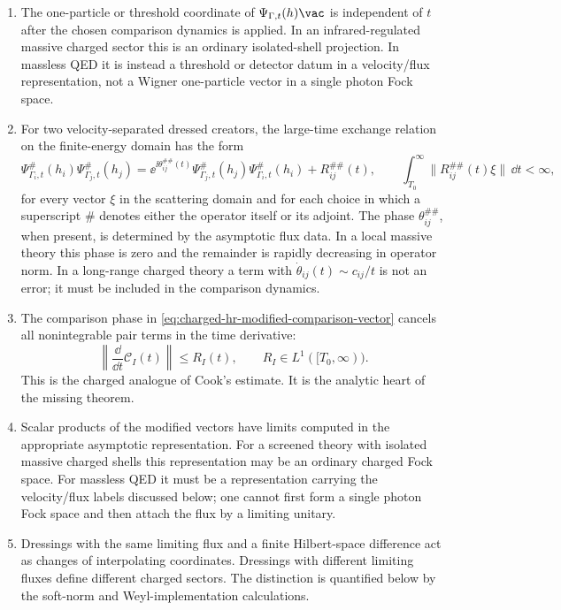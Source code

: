 \begin{enumerate}
\item The one-particle or threshold coordinate of
\(\Psi_{\Gamma,t}(h)\vac\) is independent of \(t\) after the chosen
comparison dynamics is applied.  In an infrared-regulated massive charged
sector this is an ordinary isolated-shell projection.  In massless QED it is
instead a threshold or detector datum in a velocity/flux representation, not
a Wigner one-particle vector in a single photon Fock space.
\item For two velocity-separated dressed creators, the large-time exchange
relation on the finite-energy domain has the form
\begin{equation}
  \Psi_{\Gamma_i,t}^{\#}(h_i)\Psi_{\Gamma_j,t}^{\#}(h_j)
  =
  \ee^{\ii\theta_{ij}^{\#\#}(t)}
  \Psi_{\Gamma_j,t}^{\#}(h_j)\Psi_{\Gamma_i,t}^{\#}(h_i)
  +R_{ij}^{\#\#}(t),
  \qquad
  \int_{T_0}^{\infty}\|R_{ij}^{\#\#}(t)\xi\|\,\dd t<\infty ,
  \label{eq:dressed-hr-exchange-estimate}
\end{equation}
for every vector \(\xi\) in the scattering domain and for
each choice in which a superscript \(\#\) denotes either the operator itself
or its adjoint.  The phase \(\theta_{ij}^{\#\#}\), when present, is determined
by the asymptotic flux data.  In a local massive theory this phase is zero and
the remainder is rapidly decreasing in operator norm.  In a long-range
charged theory a term with \(\dot\theta_{ij}(t)\sim c_{ij}/t\) is not an
error; it must be included in the comparison dynamics.
\item The comparison phase in
\eqref{eq:charged-hr-modified-comparison-vector} cancels all nonintegrable
pair terms in the time derivative:
\begin{equation}
  \left\|
  \frac{\dd}{\dd t}\mathcal C_I(t)
  \right\|
  \le R_I(t),
  \qquad
  R_I\in L^1([T_0,\infty)).
  \label{eq:charged-hr-modified-cook-estimate}
\end{equation}
This is the charged analogue of Cook's estimate.  It is the analytic heart of
the missing theorem.
\item Scalar products of the modified vectors have limits computed in the
appropriate asymptotic representation.  For a screened theory with isolated
massive charged shells this representation may be an ordinary charged Fock
space.  For massless QED it must be a representation carrying the
velocity/flux labels discussed below; one cannot first form a single photon
Fock space and then attach the flux by a limiting unitary.
\item Dressings with the same limiting flux and a finite Hilbert-space
difference act as changes of interpolating coordinates.  Dressings with
different limiting fluxes define different charged sectors.  The distinction
is quantified below by the soft-norm and Weyl-implementation calculations.
\end{enumerate}

